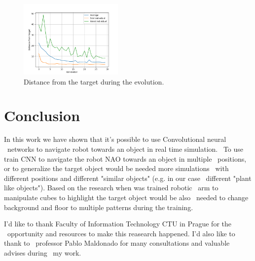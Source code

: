 \documentclass[twocolumn,10pt]{asme2ej}
\begin{document}
\begin{figure}[ht]
    \includegraphics[width=0.45\textwidth]{evolution.png}
    \caption{Distance from the target during the evolution.}
    \label{fig:gr}
\end{figure}

\section{Conclusion}
In this work we have shown that it's possible to use Convolutional neural \
networks to navigate robot towards an object in real time simulation. \
To use train CNN to navigate the robot NAO towards an object in multiple \
positions, or to generalize the target object would be needed more simulations \
with different positions and different "similar objects" (e.g. in our case \
different "plant like objects"). Based on the research when was trained robotic \
arm to manipulate cubes \cite{OAI} to highlight the target object would be also \
needed to change background and floor to multiple patterns during the training.

\begin{acknowledgment}
I'd like to thank Faculty of Information Technology CTU in Prague for the \
opportunity and resources to make this reasearch happened. I'd also like to thank to \
professor Pablo Maldonado for many consultations and valuable advises during \
my work.
\end{acknowledgment}



\end{document}
